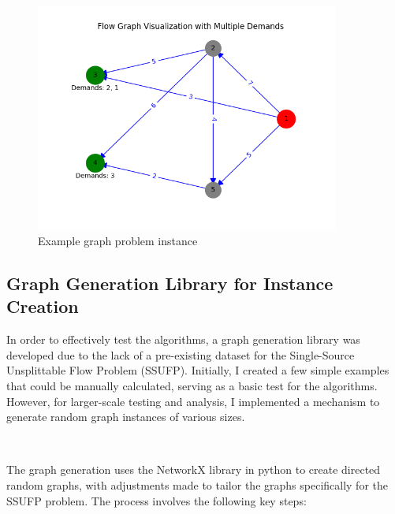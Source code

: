 \documentclass[a4paper,12pt]{article}
\begin{document}
\begin{figure}[H]
\centering
\includegraphics[width=100mm]{graph-1.png}
\caption{Example graph problem instance}
\label{fig:graph_example}
\end{figure}

\subsection{Graph Generation Library for Instance Creation}

In order to effectively test the algorithms, a graph generation library was developed due to the lack of a pre-existing dataset for the Single-Source Unsplittable Flow Problem (SSUFP). Initially, I created a few simple examples that could be manually calculated, serving as a basic test for the algorithms. However, for larger-scale testing and analysis, I implemented a mechanism to generate random graph instances of various sizes.

\

\noindent The graph generation uses the NetworkX library in python to create directed random graphs, with adjustments made to tailor the graphs specifically for the SSUFP problem. The process involves the following key steps:
\end{document}
